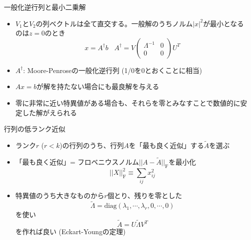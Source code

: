 \begin{frame}[t,fragile]{一般化逆行列と最小二乗解}
  \begin{itemize}
    \setlength{\itemsep}{1em}
  \item $V_1$と$V_2$の列ベクトルは全て直交する。一般解のうちノルム$|x|^2$が最小となるのは$z=0$のとき
    \[
    x = A^\dagger b \ \ \ \ A^\dagger = V \begin{pmatrix} \Lambda^{-1} & 0 \\ 0 & 0 \end{pmatrix} U^T
    \]
  \item $A^\dagger$: Moore-Penroseの一般化逆行列 (1/0を0とおくことに相当)
  \item $Ax=b$が解を持たない場合にも最良解を与える
  \item 零に非常に近い特異値がある場合も、それらを零とみなすことで数値的に安定した解がえられる
  \end{itemize}
\end{frame}

\begin{frame}[t,fragile]{行列の低ランク近似}
  \begin{itemize}
  \item ランク$r$ ($r<k$)の行列のうち、行列$A$を「最も良く近似」する$\tilde{A}$を選ぶ
  \item 「最も良く近似」= フロベニウスノルム$||A-\tilde{A}||_\mathrm{F}$を最小化
    \[
    ||X||^2_\mathrm{F} \equiv \sum_{ij} x_{ij}^2
    \]
  \item 特異値のうち大きなものから$r$個とり、残りを零とした
    \[
    \tilde{\Lambda} = \text{diag}(\lambda_1,\cdots,\lambda_r,0,\cdots,0)
    \]
    を使い
    \[
    \tilde{A} = U \tilde{\Lambda} V^T
    \]
    を作れば良い (Eckart-Youngの定理)
  \end{itemize}
\end{frame}

